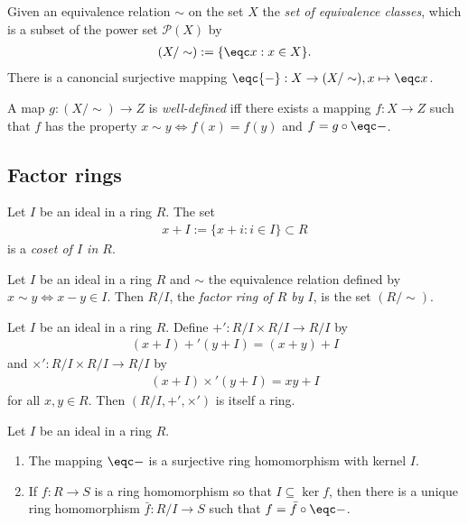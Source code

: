 \documentclass{article}
\begin{document}
\begin{definition}
	Given an equivalence relation $\sim$ on the set $X$ the \emph{set of equivalence classes},
	which is a subset of the power set $\mathcal{P}(X)$ by
	\begin{align*}
		(X/\sim) := \{\eqc x : x \in X\}.
	\end{align*}
	There is a canoncial surjective mapping $\eqc{-}:X\to (X/\sim),x\mapsto\eqc x$.
\end{definition}

\begin{definition}
	A map $g:(X/\sim)\to Z$ is \emph{well-defined} iff there exists a mapping $f:X\to Z$
	such that $f$ has the property $x\sim y\Leftrightarrow f(x)=f(y)$ and $f=g\circ\eqc-$.
\end{definition}

\subsection{Factor rings}

\begin{definition}
	Let $I$ be an ideal in a ring $R$. The set
	\begin{align*}
		x + I := \{x + i : i\in I\}\subset R
	\end{align*}
	is a \emph{coset of $I$ in $R$}.
\end{definition}

\begin{definition}
	Let $I$ be an ideal in a ring $R$ and $\sim$ the equivalence relation defined by
	$x\sim y\Leftrightarrow x-y\in I$. Then $R/I$, the \emph{factor ring of $R$ by $I$},
	is the set $(R/\sim)$.
\end{definition}

\begin{theorem}[Notes 3.6.4]
	Let $I$ be an ideal in a ring $R$. Define $+':R/I\times R/I\to R/I$ by
	\begin{align*}
		(x+I)+'(y+I) = (x+y) + I
	\end{align*}
	and $\times' : R/I\times R/I\to R/I$ by
	\begin{align*}
		(x+I)\times' (y+I) = xy + I
	\end{align*}
	for all $x,y\in R$. Then $(R/I,+',\times')$ is itself a ring.
\end{theorem}

\begin{theorem}[Notes 3.6.7]
	Let $I$ be an ideal in a ring $R$.
	\begin{enumerate}
		\item The mapping $\eqc -$ is a surjective ring homomorphism with kernel $I$.
		\item If $f:R\to S$ is a ring homomorphism so that $I\subseteq\ker f$, then there
		      is a unique ring homomorphism $\bar f:R/I\to S$ such that $f=\bar f\circ\eqc -$.
	\end{enumerate}
\end{theorem}
\end{document}
